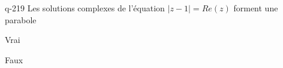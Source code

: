 \begin{truefalse}{q-219}
Les solutions complexes de l'équation $|z-1|=Re(z)$ forment une parabole
\item* Vrai
\item Faux
\end{truefalse}

